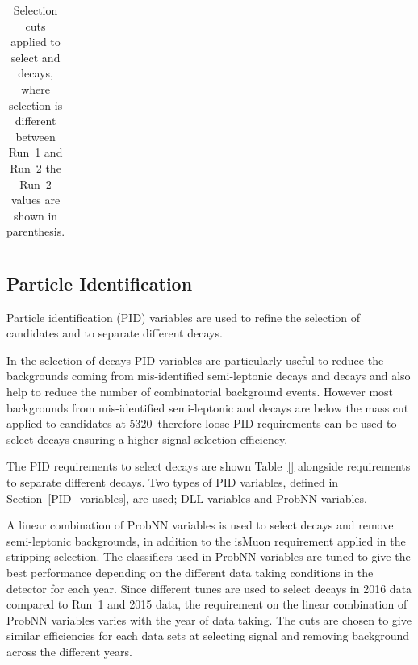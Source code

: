 \begin{table}[htbp]
\begin{center}
\begin{tabular}{lll}
\hline

\hline
\end{tabular}
\vspace{0.7cm}
\caption{Selection cuts applied to select \bsmumu and \bhh decays, where selection is different between Run~1 and Run~2 the Run~2 values are shown in parenthesis.}
\label{tab:fullpreselection}
\end{center}
\end{table}



\subsection{Particle Identification}
\label{sec:PID}
Particle identification (PID) variables are used to refine the selection of \bsmumu candidates and to separate different \bhh decays. 

In the selection of \bsmumu decays PID variables are particularly useful to reduce the backgrounds coming from mis-identified semi-leptonic decays and \bhh decays and also help to reduce the number of combinatorial background events. However most backgrounds from mis-identified semi-leptonic and \bhh decays are below the mass cut applied to \bsmumu candidates at 5320~\mevcc therefore loose PID requirements can be used to select \bsmumu decays ensuring a higher signal selection efficiency.

The PID requirements to select \bmumu decays are shown Table~\ref{} alongside requirements to separate different \bhh decays. Two types of PID variables, defined in Section~\ref{PID_variables}, are used; DLL variables and ProbNN variables. 

A linear combination of ProbNN variables is used to select \bsmumu decays and remove semi-leptonic backgrounds, in addition to the isMuon requirement applied in the stripping selection.
The classifiers used in ProbNN variables are tuned to give the best performance depending on the different data taking conditions in the detector for each year. %
Since different tunes are used to select \bsmumu decays in 2016 data compared to Run~1 and 2015 data, the requirement on the linear combination of ProbNN variables varies with the year of data taking. The cuts are chosen to give similar efficiencies for each data sets at selecting signal and removing background across the different years. 



